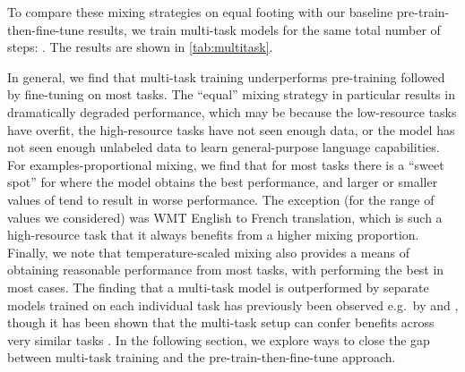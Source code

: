\documentclass[twoside,11pt]{article}
\begin{document}
To compare these mixing strategies on equal footing with our baseline pre-train-then-fine-tune results, we train multi-task models for the same total number of steps: .
The results are shown in \cref{tab:multitask}.

In general, we find that multi-task training underperforms pre-training followed by fine-tuning on most tasks.
The ``equal'' mixing strategy in particular results in dramatically degraded performance, which may be because the low-resource tasks have overfit, the high-resource tasks have not seen enough data, or the model has not seen enough unlabeled data to learn general-purpose language capabilities.
For examples-proportional mixing, we find that for most tasks there is a ``sweet spot'' for  where the model obtains the best performance, and larger or smaller values of  tend to result in worse performance.
The exception (for the range of  values we considered) was WMT English to French translation, which is such a high-resource task that it always benefits from a higher mixing proportion.
Finally, we note that temperature-scaled mixing also provides a means of obtaining reasonable performance from most tasks, with  performing the best in most cases.
The finding that a multi-task model is outperformed by separate models trained on each individual task has previously been observed e.g.\ by \citet{arivazhagan2019massively} and \citet{mccann2018natural}, though it has been shown that the multi-task setup can confer benefits across very similar tasks \cite{liu2019multi,ratner2018snorkel}.
In the following section, we explore ways to close the gap between multi-task training and the pre-train-then-fine-tune approach.
\end{document}
